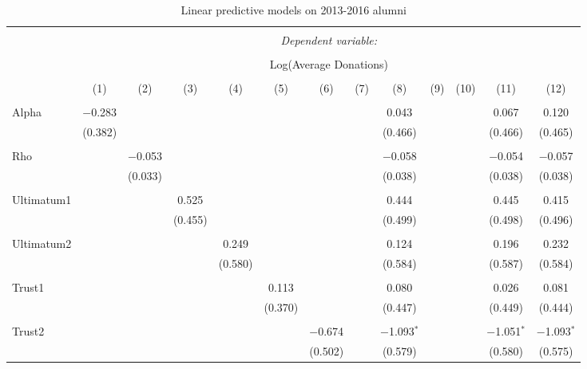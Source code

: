 \newpage

\begin{table}[!htbp] \centering 
  \caption{Linear predictive models on 2013-2016 alumni} 
  \label{} 
    \begin{adjustbox}{width=\textwidth}
\begin{tabular}{@{\extracolsep{5pt}}lcccccccccccc} 
\\[-1.8ex]\hline 
\hline \\[-1.8ex] 
 & \multicolumn{12}{c}{\textit{Dependent variable:}} \\ 
\cline{2-13} 
\\[-1.8ex] & \multicolumn{12}{c}{Log(Average Donations)} \\ 
\\[-1.8ex] & (1) & (2) & (3) & (4) & (5) & (6) & (7) & (8) & (9) & (10) & (11) & (12)\\ 
\hline \\[-1.8ex] 
 Alpha & $-$0.283 &  &  &  &  &  &  & 0.043 &  &  & 0.067 & 0.120 \\ 
  & (0.382) &  &  &  &  &  &  & (0.466) &  &  & (0.466) & (0.465) \\ 
  & & & & & & & & & & & & \\ 
 Rho &  & $-$0.053 &  &  &  &  &  & $-$0.058 &  &  & $-$0.054 & $-$0.057 \\ 
  &  & (0.033) &  &  &  &  &  & (0.038) &  &  & (0.038) & (0.038) \\ 
  & & & & & & & & & & & & \\ 
 Ultimatum1 &  &  & 0.525 &  &  &  &  & 0.444 &  &  & 0.445 & 0.415 \\ 
  &  &  & (0.455) &  &  &  &  & (0.499) &  &  & (0.498) & (0.496) \\ 
  & & & & & & & & & & & & \\ 
 Ultimatum2 &  &  &  & 0.249 &  &  &  & 0.124 &  &  & 0.196 & 0.232 \\ 
  &  &  &  & (0.580) &  &  &  & (0.584) &  &  & (0.587) & (0.584) \\ 
  & & & & & & & & & & & & \\ 
 Trust1 &  &  &  &  & 0.113 &  &  & 0.080 &  &  & 0.026 & 0.081 \\ 
  &  &  &  &  & (0.370) &  &  & (0.447) &  &  & (0.449) & (0.444) \\ 
  & & & & & & & & & & & & \\ 
 Trust2 &  &  &  &  &  & $-$0.674 &  & $-$1.093$^{*}$ &  &  & $-$1.051$^{*}$ & $-$1.093$^{*}$ \\ 
  &  &  &  &  &  & (0.502) &  & (0.579) &  &  & (0.580) & (0.575) \\ 

\end{tabular}
\end{adjustbox}
\end{table}
